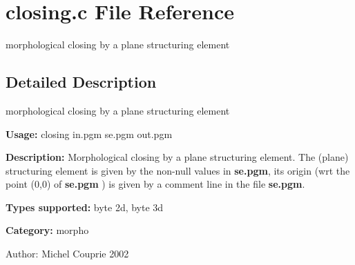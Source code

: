 \section{closing.c File Reference}
\label{closing_8c}
morphological closing by a plane structuring element  




\label{_details}
\subsection{Detailed Description}
morphological closing by a plane structuring element 

{\bf Usage:} closing in.pgm se.pgm out.pgm

{\bf Description:} Morphological closing by a plane structuring element. The (plane) structuring element is given by the non-null values in {\bf se.pgm}, its origin (wrt the point (0,0) of {\bf se.pgm} ) is given by a comment line in the file {\bf se.pgm}.

{\bf Types supported:} byte 2d, byte 3d

{\bf Category:} morpho

\begin{Desc}
\item[Author:]Michel Couprie 2002 \end{Desc}

